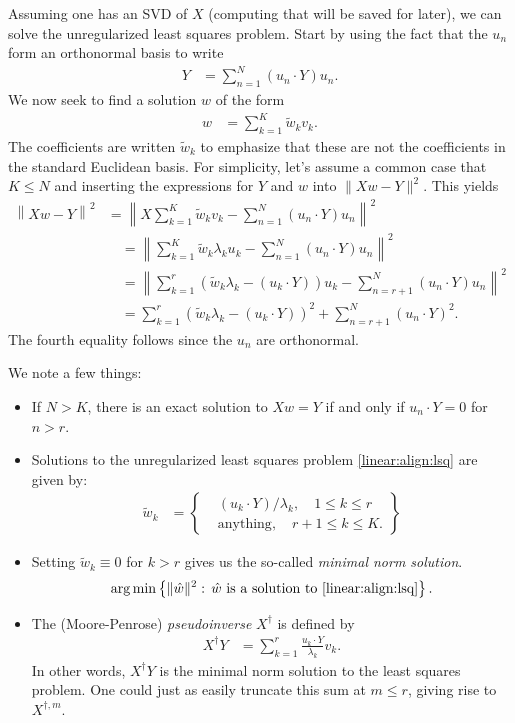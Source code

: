 Assuming one has an SVD of $X$ (computing that will be saved for later), we can solve the unregularized least squares problem.  Start by using the fact that the $u_n$ form an orthonormal basis to write
\begin{align*}
  Y &= \sum_{n=1}^N (u_n\cdot Y)u_n.
\end{align*}
We now seek to find a solution $w$ of the form 
\begin{align*}
  w &= \sum_{k=1}^K \tilde w_k v_k.
\end{align*}
The coefficients are written $\tilde w_k$ to emphasize that these are not the coefficients in the standard Euclidean basis.  For simplicity, let's assume a common case that $K\leq N$ and inserting the expressions for $Y$ and $w$ into $\|Xw-Y\|^2$.  This yields
\begin{align*}
  \left\|Xw - Y\right\|^2 &= \left\| X\sum_{k=1}^K\tilde w_k v_k - \sum_{n=1}^N(u_n\cdot Y)u_n\right\|^2 \\
    &\quad= \left\| \sum_{k=1}^K\tilde w_k\lambda_k u_k - \sum_{n=1}^N(u_n\cdot Y)u_n\right\|^2 \\
    &\quad= \left\| \sum_{k=1}^r(\tilde w_k\lambda_k - (u_k\cdot Y))u_k - \sum_{n=r+1}^N(u_n\cdot Y)u_n\right\|^2 \\
    &\quad= \sum_{k=1}^r \left( \tilde w_k\lambda_k - (u_k\cdot Y) \right)^2 + \sum_{n=r+1}^N(u_n\cdot Y)^2.
\end{align*}
The fourth equality follows since the $u_n$ are orthonormal.  
\begin{remark}
  \label{linear:remark:svd-soln}
We note a few things:
\begin{itemize}
  \item If $N>K$, there is an exact solution to $Xw=Y$ if and only if $u_n\cdot Y=0$ for $n>r$.
  \item Solutions to the unregularized least squares problem \eqref{linear:align:lsq} are given by:
    \begin{align*}
      \tilde w_k &= \left\{ 
        \begin{matrix}
          &(u_k\cdot Y)/\lambda_k,\quad 1\leq k\leq r\\
          &\mbox{anything},\quad r+1\leq k\leq K.
        \end{matrix}
      \right\}
    \end{align*}
  \item Setting $\tilde w_k\equiv0$ for $k>r$ gives us the so-called \emph{minimal norm solution}.
    \begin{align*}
      \arg\min\left\{ \|\hat w\|^2:\, \hat w \mbox{ is a solution to \eqref{linear:align:lsq}}\right\}.
    \end{align*}
  \item The (Moore-Penrose) \emph{pseudoinverse} $X^\dagger$ is defined by
    \begin{align*}
      X^\dagger Y &= \sum_{k=1}^r \frac{u_k\cdot Y}{\lambda_k}v_k.
    \end{align*}
    In other words, $X^\dagger Y$ is the minimal norm solution to the least squares problem.  One could just as easily truncate this sum at $m\leq r$, giving rise to $X^{\dagger,m}$.
\end{itemize}
\end{remark}

